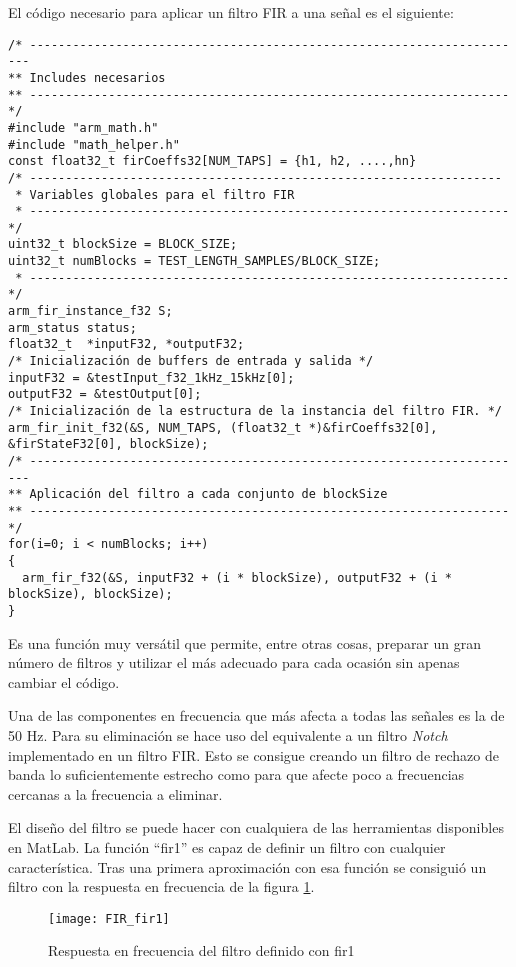 El código necesario para aplicar un filtro FIR a una señal es el siguiente:

\begin{lstlisting}[label=algoritmo:STM_filtro,style = STM-code,frame=single,caption=Filtro FIR en STM]
/* ----------------------------------------------------------------------
** Includes necesarios
** ------------------------------------------------------------------- */
#include "arm_math.h"
#include "math_helper.h"
const float32_t firCoeffs32[NUM_TAPS] = {h1, h2, ....,hn}
/* ------------------------------------------------------------------
 * Variables globales para el filtro FIR
 * ------------------------------------------------------------------- */
uint32_t blockSize = BLOCK_SIZE;
uint32_t numBlocks = TEST_LENGTH_SAMPLES/BLOCK_SIZE;
 * ------------------------------------------------------------------- */
arm_fir_instance_f32 S;
arm_status status;
float32_t  *inputF32, *outputF32;
/* Inicialización de buffers de entrada y salida */
inputF32 = &testInput_f32_1kHz_15kHz[0];
outputF32 = &testOutput[0];
/* Inicialización de la estructura de la instancia del filtro FIR. */
arm_fir_init_f32(&S, NUM_TAPS, (float32_t *)&firCoeffs32[0], &firStateF32[0], blockSize);
/* ----------------------------------------------------------------------
** Aplicación del filtro a cada conjunto de blockSize
** ------------------------------------------------------------------- */
for(i=0; i < numBlocks; i++)
{
  arm_fir_f32(&S, inputF32 + (i * blockSize), outputF32 + (i * blockSize), blockSize);
}
\end{lstlisting}

Es una función muy versátil que permite, entre otras cosas, preparar un gran número de filtros y utilizar el más adecuado para cada ocasión sin apenas cambiar el código.

Una de las componentes en frecuencia que más afecta a todas las señales es la de 50 Hz. Para su eliminación se hace uso del equivalente a un filtro \textit{Notch} implementado en un filtro \acrshort{FIR}. Esto se consigue creando un filtro de rechazo de banda lo suficientemente estrecho como para que afecte poco a frecuencias cercanas a la frecuencia a eliminar.

El diseño del filtro se puede hacer con cualquiera de las herramientas disponibles en MatLab. La función ``fir1'' es capaz de definir un filtro con cualquier característica. Tras una primera aproximación con esa función se consiguió un filtro con la respuesta en frecuencia de la figura \ref{fig:FIR_fir1}.
\begin{figure} [H]
    \centering
    \texttt{[image: FIR\_fir1]}
    \caption{Respuesta en frecuencia del filtro definido con fir1}
    \label{fig:FIR_fir1}
\end{figure}

